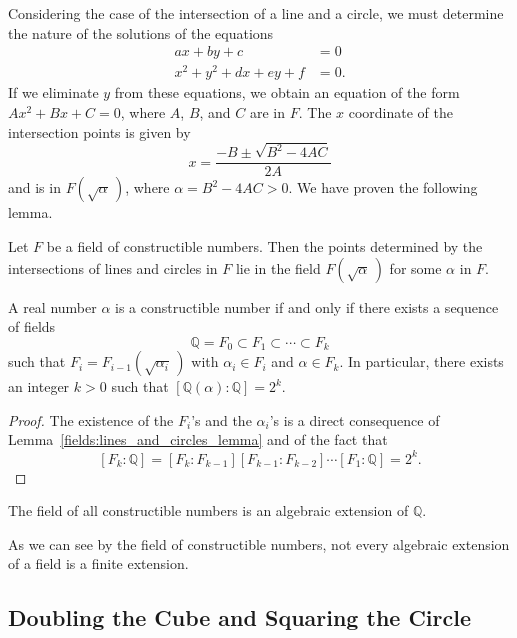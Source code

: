 Considering the case of the intersection of a line and a circle, we
must determine the nature of the solutions of the equations
\begin{align*}
a x + by + c & = 0 \\
x^2 + y^2 + d x + e y + f & = 0.
\end{align*}
If we eliminate $y$ from these equations, we obtain an equation of
the form $Ax^2 + B x + C = 0$, where $A$, $B$, and $C$ are in $F$. The
$x$ coordinate of the intersection points is given by
\[
x = \frac{- B \pm \sqrt{B^2 - 4 A C} }{2 A}
\]
and is in $F( \sqrt{\alpha}\, )$, where $\alpha = B^2 - 4 A C > 0$.
We have proven the following lemma.

 
\begin{lemma}\label{fields:lines_and_circles_lemma}
Let $F$ be a field of constructible numbers. Then the points
determined by the intersections of lines and circles in $F$ lie in the
field $F( \sqrt{\alpha}\, )$ for some $\alpha$ in $F$.  
\end{lemma}
 
 
\begin{theorem}
A real number $\alpha$ is a constructible number if and only if there
exists a  sequence of fields
\[
{\mathbb Q} = F_0 \subset F_1 \subset \cdots \subset F_k
\]
such that $F_i = F_{i-1}( \sqrt{ \alpha_i}\, )$ with $\alpha_i \in F_i$ 
and  $\alpha \in F_k$. 
In particular, there exists an integer $k > 0$ such that 
$[{\mathbb Q}(\alpha) : {\mathbb Q} ] = 2^k$.
\end{theorem} %
 
 
\begin{proof}
The existence of the $F_i$'s and the $\alpha_i$'s is a direct
consequence of Lemma~\ref{fields:lines_and_circles_lemma} and of the fact that
\[
[F_k: {\mathbb Q}] = [F_k : F_{k-1}][F_{k-1} : F_{k-2}] \cdots [F_1:
{\mathbb Q} ] = 2^k.
\]
\end{proof}


\begin{corollary}
The field of all constructible numbers is an algebraic extension of
${\mathbb Q}$.
\end{corollary}
 

As we can see by the field of constructible numbers, not every
algebraic extension of a field is a finite extension. 
 


\subsection*{Doubling the Cube and Squaring the Circle}
 

